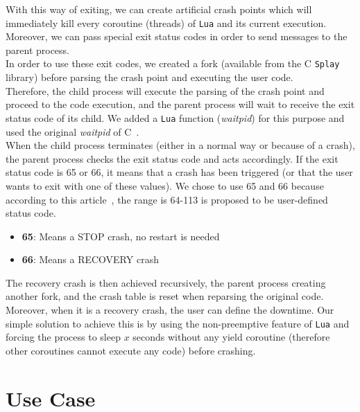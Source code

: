 \documentclass{eplmastersthesis}
\begin{document}
        With this way of exiting, we can create artificial crash points which
        will immediately kill every coroutine (threads) of \texttt{Lua} and its
        current execution. Moreover, we can pass special exit status codes
        in order to send messages to the parent process.\\
        In order to use these exit codes, we created a fork (available from
        the C \texttt{Splay} library) before parsing the crash point and executing
        the user code.\\
        Therefore, the child process will execute the parsing of the crash
        point and proceed to the code execution, and the parent process will
        wait to receive the exit status code of its child. We added a \texttt{Lua}
        function (\textit{waitpid}) for this purpose and used the original \textit{waitpid}
        of C~\cite{waitpid}.\\

        When the child process terminates (either in a normal way or because
        of a crash), the parent process checks the exit status code and acts
        accordingly. If the exit status code is 65 or 66, it means that a
        crash has been triggered (or that the user wants to exit
        with one of these values). We chose to use 65 and 66 because
        according to this article~\cite{StatusCode}, the range is 64-113
        is proposed to be user-defined status code.

        \begin{itemize}
          \item \textbf{65}: Means a \textsc{STOP} crash, no restart is needed
          \item \textbf{66}: Means a \textsc{RECOVERY} crash
        \end{itemize}

        The recovery crash is then achieved recursively, the parent process
        creating another fork, and the crash table is reset when reparsing
        the original code. Moreover, when it is a recovery crash, the user
        can define the downtime. Our simple solution to achieve this is by
        using the non-preemptive feature of \texttt{Lua} and forcing the process
        to sleep $x$ seconds without any yield coroutine (therefore other
        coroutines cannot execute any code) before crashing.

  \chapter{Use Case}
  \label{chap:usercase}
\end{document}
